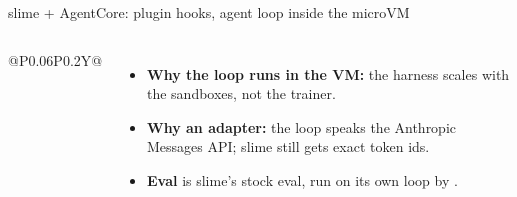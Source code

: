 \begin{frame}[fragile]{slime + AgentCore: plugin hooks, agent loop inside the microVM}
\begin{columns}[T]
\begin{tabularx}{\linewidth}{@{}P{0.06\linewidth}P{0.2\linewidth}Y@{}}
\bottomrule
\end{tabularx}
\par\vspace{1.5mm}
\begin{itemize}\tiny\setlength{\itemsep}{0.4mm}
\item \textbf{Why the loop runs in the VM:} the harness scales with the sandboxes, not the trainer.
\item \textbf{Why an adapter:} the loop speaks the Anthropic Messages API; slime still gets exact token ids.
\item \textbf{Eval} is slime's stock eval, run on its own loop by .
\end{itemize}
\end{columns}
\end{frame}

